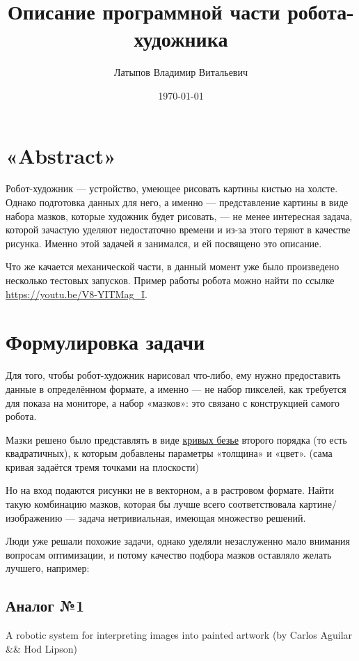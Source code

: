 \documentclass[11pt]{article}
\title{Описание программной части робота-художника}
\author{Латыпов Владимир Витальевич}
\date{\today}
\begin{document}
    \maketitle
    \newpage
    \tableofcontents
    \newpage

    \section{«Abstract»}\label{sec:abstract}
    Робот-художник — устройство, умеющее рисовать картины кистью на холсте.
    Однако подготовка данных для него, а именно — представление картины в виде набора мазков, которые художник будет рисовать,
    — не менее интересная задача, которой зачастую уделяют недостаточно времени и из-за этого теряют в качестве рисунка.
    Именно этой задачей я занимался, и ей посвящено это описание.

    Что же качается механической части, в данный момент уже было произведено несколько тестовых запусков.
    Пример работы робота можно найти по ссылке \url{https://youtu.be/V8-YITMag_I}.

    \section{Формулировка задачи}\label{sec:formulating_task}

    Для того, чтобы робот-художник нарисовал что-либо, ему нужно предоставить данные в определённом формате, а именно — не набор пикселей,
    как требуется для показа на мониторе, а набор «мазков»: это связано с конструкцией самого робота.

    Мазки решено было представлять в виде \href{https://en.wikipedia.org/wiki/B\%C3\%A9zier_curve}{кривых безье} второго порядка (то есть квадратичных), к которым добавлены параметры «толщина» и «цвет».
    (сама кривая задаётся тремя точками на плоскости)

    Но на вход подаются рисунки не в векторном, а в растровом формате.
    Найти такую комбинацию мазков, которая бы лучше всего соответствовала картине/изображению — задача нетривиальная, имеющая множество решений.

    Люди уже решали похожие задачи, однако уделяли незаслуженно мало внимания вопросам оптимизации,
    и потому качество подбора мазков оставляло желать лучшего, например:

    \subsection{Аналог №1}\label{subsec:analog-1}
    A robotic system for interpreting images into painted artwork (by Carlos Aguilar \&\& Hod Lipson)
\end{document}

